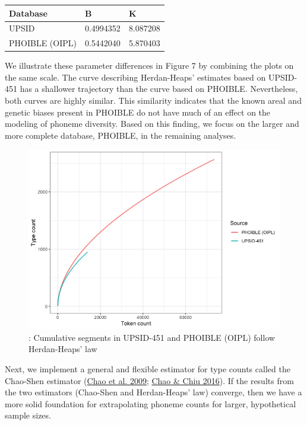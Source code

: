 \documentclass[
]{article}
\begin{document}
\begin{longtable}[]{@{}lll@{}}
\toprule\noalign{}
Database & B & K \\
\midrule\noalign{}
\endhead
\bottomrule\noalign{}
\endlastfoot
UPSID & 0.4994352 & 8.087208 \\
PHOIBLE (OIPL) & 0.5442040 & 5.870403 \\
\end{longtable}

We illustrate these parameter differences in Figure 7 by combining the
plots on the same scale. The curve describing Herdan-Heaps' estimates
based on UPSID-451 has a shallower trajectory than the curve based on
PHOIBLE. Nevertheless, both curves are highly similar. This similarity
indicates that the known areal and genetic biases present in PHOIBLE do
not have much of an effect on the modeling of phoneme diversity. Based
on this finding, we focus on the larger and more complete database,
PHOIBLE, in the remaining analyses.

\begin{figure}

{\centering \includegraphics[width=0.8\linewidth]{README_files/figure-gfm/compare_models-1} 

}

\caption{\label{fig:upsid}: Cumulative segments in UPSID-451 and PHOIBLE (OIPL) follow Herdan-Heaps' law}\label{fig:compare_models}
\end{figure}

Next, we implement a general and flexible estimator for type counts
called the Chao-Shen estimator
(\protect\hyperlink{ref-Chao_etal2009}{Chao et al. 2009};
\protect\hyperlink{ref-ChaoChiu2016}{Chao \& Chiu 2016}). If the results
from the two estimators (Chao-Shen and Herdan-Heaps' law) converge, then
we have a more solid foundation for extrapolating phoneme counts for
larger, hypothetical sample sizes.
\end{document}
